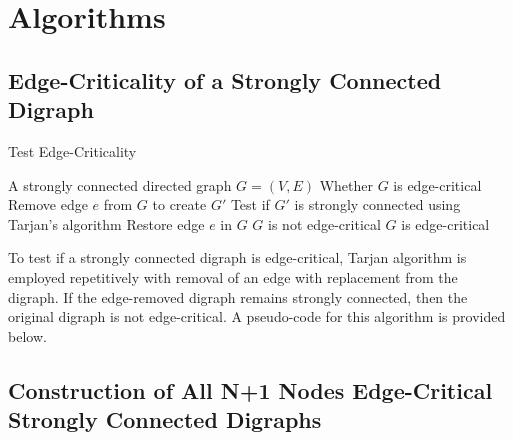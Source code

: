 \documentclass[runningheads]{llncs}
\begin{document}
\section{Algorithms}

\subsection{Edge-Criticality of a Strongly Connected Digraph}

\begin{algorithm}
\caption{Test Edge-Criticality}
\label{alg:edge_criticality}
\begin{algorithmic}[1]
\REQUIRE A strongly connected directed graph $G = (V, E)$
\ENSURE Whether $G$ is edge-critical
    \STATE Remove edge $e$ from $G$ to create $G'$
    \STATE Test if $G'$ is strongly connected using Tarjan's algorithm
        \STATE Restore edge $e$ in $G$
    \ELSE
        \RETURN $G$ is not edge-critical
    \ENDIF
\ENDFOR
\RETURN $G$ is edge-critical
\end{algorithmic}
\end{algorithm}
 
 To test if a strongly connected digraph is edge-critical, Tarjan algorithm is employed repetitively with removal of an edge with replacement from the digraph. If the edge-removed digraph remains strongly connected, then the original digraph is not edge-critical. A pseudo-code for this algorithm is provided below.

\subsection{Construction of All N+1 Nodes Edge-Critical Strongly Connected Digraphs}
\end{document}
